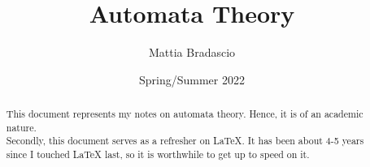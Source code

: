 \documentclass[12pt, letterpaper]{article}
\title{Automata Theory}
\author{Mattia Bradascio}
\date{Spring/Summer 2022}
\begin{document}
\begin{titlepage}
\maketitle
\end{titlepage}

\begin{abstract}

    This document represents my notes on automata theory.
    Hence, it is of an academic nature. \\ 
    Secondly, this document serves as a refresher on LaTeX. 
    It has been about 4-5 years since I touched LaTeX last,
    so it is worthwhile to get up to speed on it.

\end{abstract}
\end{document}
